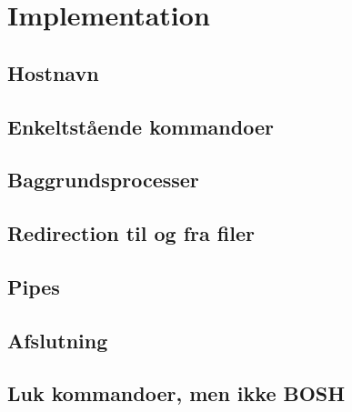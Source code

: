 \section{Implementation}
\subsection{Hostnavn}
\subsection{Enkeltstående kommandoer}
\subsection{Baggrundsprocesser}
\subsection{Redirection til og fra filer}
\subsection{Pipes}
\subsection{Afslutning}
\subsection{Luk kommandoer, men ikke BOSH}
